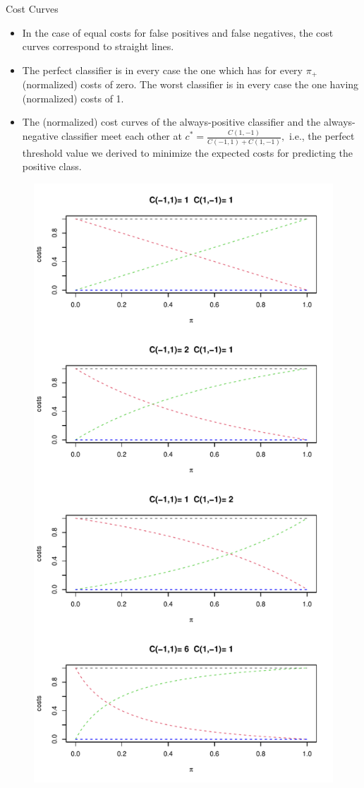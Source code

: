 \documentclass[11pt,compress,t,notes=noshow, xcolor=table]{beamer}
\begin{document}
		\begin{frame}{Cost Curves}
		\footnotesize
		
		\begin{minipage}{0.55\textwidth}
		\begin{itemize}
			\item In the case of equal costs for false positives and false negatives, the cost curves correspond to straight lines. 
			\item The {\color{blue} perfect classifier} is in every case the one which has for every $\pi_+$ (normalized) costs of zero. The worst classifier is in every case the one having (normalized) costs of 1.
%			
			\item The (normalized) cost curves of the {\color{red} always-positive classifier} and the {\color{green} always-negative classifier} meet each other at $c^* = \frac{C(1,-1)}{C(-1,1)+C(1,-1)},$ i.e., the perfect threshold value we derived to minimize the expected costs for predicting the positive class.
		\end{itemize}
			\end{minipage}
			\begin{minipage}{0.4\textwidth}
				\begin{figure}
					\centering
					\includegraphics[width=0.8\linewidth]{figure_man/cost_curves_trivial_classifiers}

\end{figure}
\end{minipage}
\end{frame}
\end{document}
